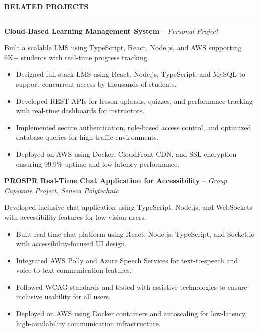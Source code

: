 \documentclass[10pt,letterpaper]{article}
\begin{document}
\vspace{6pt}

\textbf{RELATED PROJECTS}\\[-8pt]
\noindent\rule{\textwidth}{1pt}

\vspace{-2pt}

\textbf{Cloud-Based Learning Management System} -- \emph{Personal Project}

\vspace{-1pt}

Built a scalable LMS using TypeScript, React, Node.js, and AWS supporting 6K+ students with real-time progress tracking.
\vspace{-1pt}
\begin{itemize}
\item Designed full stack LMS using React, Node.js, TypeScript, and MySQL to support concurrent access by thousands of students.
\item Developed REST APIs for lesson uploads, quizzes, and performance tracking with real-time dashboards for instructors.
\item Implemented secure authentication, role-based access control, and optimized database queries for high-traffic environments.
\item Deployed on AWS using Docker, CloudFront CDN, and SSL encryption ensuring 99.9\% uptime and low-latency performance.
\end{itemize}

\textbf{PROSPR  Real-Time Chat Application for Accessibility} -- \emph{Group Capstone Project, Seneca Polytechnic}

\vspace{-1pt}

Developed inclusive chat application using TypeScript, Node.js, and WebSockets with accessibility features for low-vision users.
\vspace{-1pt}
\begin{itemize}
\item Built real-time chat platform using React, Node.js, TypeScript, and Socket.io with accessibility-focused UI design.
\item Integrated AWS Polly and Azure Speech Services for text-to-speech and voice-to-text communication features.
\item Followed WCAG standards and tested with assistive technologies to ensure inclusive usability for all users.
\item Deployed on AWS using Docker containers and autoscaling for low-latency, high-availability communication infrastructure.
\end{itemize}
\end{document}

